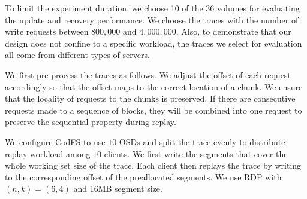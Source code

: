 

To limit the experiment duration, we choose 10 of the 36 volumes for
evaluating the update and recovery performance. We choose the traces with the
number of write requests between $800,000$ and $4,000,000$. Also, to
demonstrate that our design does not confine to a specific workload, the
traces we select for evaluation all come from different types of servers.

We first pre-process the traces as follows.
We adjust the offset of each request accordingly so that the offset maps to
the correct location of a chunk.  We ensure that the locality of requests
to the chunks is preserved. 
If there are consecutive requests made to a sequence of blocks, they will be
combined into one request to preserve the sequential property during replay.

We configure CodFS to use $10$ OSDs and split the trace evenly to
distribute replay workload among $10$ clients. We first write the segments
that cover the whole working set size of the trace.  Each client then replays
the trace by writing to the corresponding offset of the preallocated segments.
We use RDP \cite{corbett04} with $(n,k)=(6,4)$ and 16MB segment size. 

